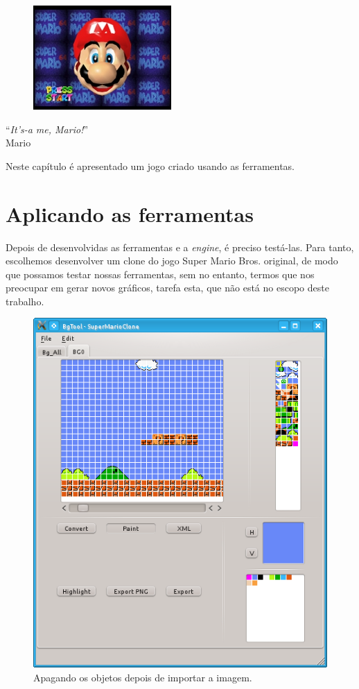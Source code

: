 \documentclass[brazil]{abnt}
\begin{document}
\vfill{}
\begin{flushright}{}
\begin{figure}[h!]
\hfill\includegraphics{imgs/mario.jpg}
\end{figure}
``\emph{It’s-a me, Mario!}''\\
{\small Mario}\end{flushright}{\small \par}
\vfill{}

Neste capítulo é apresentado um jogo criado usando as ferramentas.
\newpage

\section{Aplicando as ferramentas}

Depois de desenvolvidas as ferramentas e a \textit{engine}, é preciso testá-las. Para tanto, escolhemos desenvolver um clone do jogo Super Mario Bros. original, de modo que possamos testar nossas ferramentas, sem no entanto, termos que nos preocupar em gerar novos gráficos, tarefa esta, que não está no escopo deste trabalho.

\begin{figure}[h!]
\centering
\includegraphics[scale=1]{imgs/bgtool2.png}
\caption{Apagando os objetos depois de importar a imagem.}
\label{fig:objetos}
\end{figure}
\end{document}
